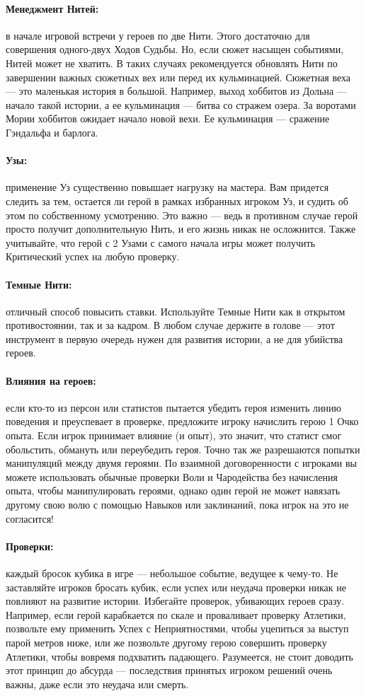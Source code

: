 \paragraph{Менеджмент Нитей:} в начале игровой встречи у героев по две Нити. Этого достаточно для совершения одного-двух Ходов Судьбы. Но, если сюжет насыщен событиями, Нитей может не хватить. В таких случаях рекомендуется обновлять Нити по завершении важных сюжетных вех или перед их кульминацией. Сюжетная веха — это маленькая история в большой. Например, выход хоббитов из Дольна — начало такой истории, а ее кульминация — битва со стражем озера. За воротами Мории хоббитов ожидает начало новой вехи. Ее кульминация — сражение Гэндальфа и барлога.
\paragraph{Узы:} применение Уз существенно повышает нагрузку на мастера. Вам придется следить за тем, остается ли герой в рамках избранных игроком Уз, и судить об этом по собственному усмотрению. Это важно — ведь в противном случае герой просто получит дополнительную Нить, и его жизнь никак не осложнится. Также учитывайте, что герой с 2 Узами с самого начала игры может получить Критический успех на любую проверку.
\paragraph{Темные Нити:} отличный способ повысить ставки. Используйте Темные Нити как в открытом противостоянии, так и за кадром. В любом случае держите в голове — этот инструмент в первую очередь нужен для развития истории, а не для убийства героев.
\paragraph{Влияния на героев:} если кто-то из персон или статистов пытается убедить героя изменить линию поведения и преуспевает в проверке, предложите игроку начислить герою 1 Очко опыта. Если игрок принимает влияние (и опыт), это значит, что статист смог обольстить, обмануть или переубедить героя. Точно так же разрешаются попытки манипуляций между двумя героями. По взаимной договоренности с игроками вы можете использовать обычные проверки Воли и Чародейства без начисления опыта, чтобы манипулировать героями, однако один герой не может навязать другому свою волю с помощью Навыков или заклинаний, пока игрок на это не согласится!
\paragraph{Проверки:} каждый бросок кубика в игре — небольшое событие, ведущее к чему-то. Не заставляйте игроков бросать кубик, если успех или неудача проверки никак не повлияют на развитие истории. Избегайте проверок, убивающих героев сразу. Например, если герой карабкается по скале и проваливает проверку Атлетики, позвольте ему применить Успех с Неприятностями, чтобы уцепиться за выступ парой метров ниже, или же позвольте другому герою совершить проверку Атлетики, чтобы вовремя подхватить падающего. Разумеется, не стоит доводить этот принцип до абсурда — последствия принятых игроком решений очень важны, даже если это неудача или смерть.
